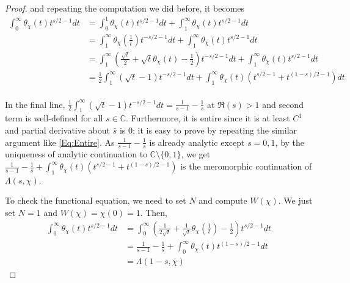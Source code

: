 \documentclass[a4paper, 12pt]{article}
\theoremstyle{Mydefinition}
\theoremstyle{Mytheorem}
\begin{document}
\begin{proof}
and repeating the computation we did before, it becomes
\begin{equation*}
\begin{split}
    \int_0^\infty \theta_\chi(t)t^{s/2-1}dt &= \int_{0}^1 \theta_{\chi}(t)t^{s/2-1}dt+ \int_1^\infty \theta_\chi(t)t^{s/2-1}dt\\
    &=\int_1^\infty \theta_\chi\left(\frac{1}{t}\right)t^{-s/2-1}dt+ \int_1^\infty \theta_\chi(t)t^{s/2-1}dt\\
    &=\int_1^\infty \left(\frac{\sqrt{t}}{2}+\sqrt{t}\theta_\chi(t)-\frac{1}{2}\right)t^{-s/2-1}dt+ \int_1^\infty \theta_\chi(t)t^{s/2-1}dt\\
    &=\frac{1}{2}\int_1^\infty (\sqrt{t}-1)t^{-s/2-1}dt + \int_1^\infty \theta_\chi(t)\left(t^{s/2-1}+t^{(1-s)/2-1}\right)dt\\
\end{split}
\end{equation*}

In the final line, $\frac{1}{2}\int_1^\infty (\sqrt{t}-1)t^{-s/2-1}dt = \frac{1}{s-1}-\frac{1}{s}$ at $\Re(s)>1$ and second term is well-defined for all $s\in \mathbb{C}$. Furthermore, it is entire since it is at least $C^1$ and partial derivative about $\bar{s}$ is $0$; it is easy to prove by repeating the similar argument like \eqref{Eq:Entire}. As $\frac{1}{s-1}-\frac{1}{s}$ is already analytic except $s=0,1$, by the uniqueness of analytic continuation to $\mathbb{C}\setminus\{0,1\}$, we get $\frac{1}{s-1}-\frac{1}{s} + \int_1^\infty \theta_\chi(t)\left(t^{s/2-1}+t^{(1-s)/2-1}\right)$ is the meromorphic continuation of $\Lambda(s, \chi)$. 

To check the functional equation, we need to set $N$ and compute $W(\chi)$. We just set $N=1$ and $W(\chi) = \chi(0) = 1$. Then,
\begin{equation*}
\begin{split}
    \int_0^\infty \theta_\chi(t)t^{s/2-1}dt &= \int_0^\infty \left(\frac{1}{2\sqrt{t}} + \frac{1}{\sqrt{t}}\theta_\chi\left(\frac{1}{t}\right)-\frac{1}{2}\right) t^{s/2-1}dt\\
    &=\frac{1}{s-1}-\frac{1}{s} + \int_0^\infty \theta_\chi(t) t^{(1-s)/2-1}dt\\
    &=\Lambda(1-s, \overline{\chi})
\end{split}
\end{equation*}
\end{proof}
\end{document}
